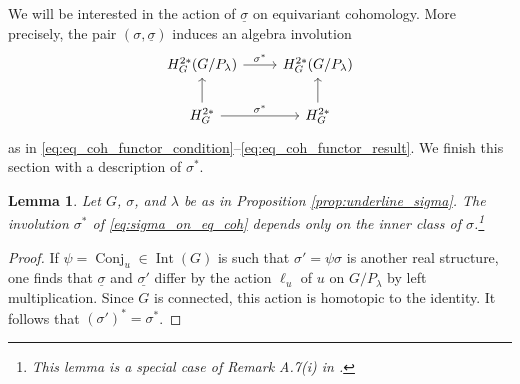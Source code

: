 \documentclass{amsart}
\newcommand{\Conj}{\operatorname{Conj}}
\newcommand{\Int}{\operatorname{Int}}
\theoremstyle{definition}
\theoremstyle{plain}
\newtheorem{lem}[defn]{Lemma}
\theoremstyle{remark}
\begin{document}
We will be interested in the action of $\underline{\sigma}$ on equivariant cohomology. More precisely, the pair $(\sigma, \underline{\sigma})$ induces an algebra involution
\begin{equation}
\label{eq:sigma_on_eq_coh}
\begin{tikzcd}
    H^{2*}_G(G/P_\lambda)
        \arrow[r, "\sigma^*"]
    & H^{2*}_G(G/P_\lambda)
    \\
    H^{2*}_G
        \arrow[u]
        \arrow[r, "\sigma^*"]
    & H^{2*}_G
        \arrow[u]
\end{tikzcd} 
\end{equation}
as in \eqref{eq:eq_coh_functor_condition}--\eqref{eq:eq_coh_functor_result}. We finish this section with a description of $\sigma^*$.
\begin{lem}
\label{lem:inner_class_only}
    Let $G$, $\sigma$, and $\lambda$ be as in Proposition \ref{prop:underline_sigma}. The involution $\sigma^*$ of \eqref{eq:sigma_on_eq_coh} depends only on the inner class of $\sigma$.\footnote{This lemma is a special case of Remark A.7(i) in \cite{Zhu2012_geometric}.}
\end{lem}
\begin{proof}
    If $\psi = \Conj_u\in \Int(G)$ is such that $\sigma'=\psi\sigma$ is another real structure, one finds that $\underline{\sigma}$ and $\underline{\sigma'}$ differ by the action $\ell_u$ of $u$ on $G/P_\lambda$ by left multiplication. Since $G$ is connected, this action is homotopic to the identity. It follows that $(\sigma')^* = \sigma^*$.
\end{proof}
\end{document}
